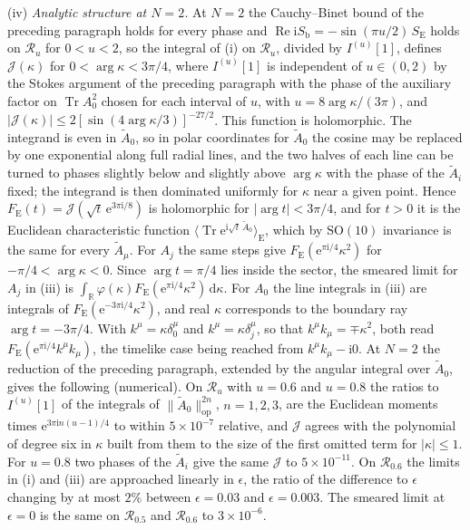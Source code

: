 (iv) \emph{Analytic structure at \(N=2\).} At \(N=2\) the Cauchy--Binet bound of the preceding paragraph holds for every phase and \(\operatorname{Re}\mathrm iS_{\mathrm b}=-\sin(\pi u/2)\,S_{\mathrm E}\) holds on \(\mathcal R_u\) for \(0<u<2\), so the integral of (i) on \(\mathcal R_u\), divided by \(I^{(u)}[1]\), defines \(\mathcal J(\kappa)\) for \(0<\arg\kappa<3\pi/4\), where \(I^{(u)}[1]\) is independent of \(u\in(0,2)\) by the Stokes argument of the preceding paragraph with the phase of the auxiliary factor on \(\operatorname{Tr}A_0^2\) chosen for each interval of \(u\), with \(u=8\arg\kappa/(3\pi)\), and \(|\mathcal J(\kappa)|\le2[\sin(4\arg\kappa/3)]^{-27/2}\). This function is holomorphic. The integrand is even in \(\tilde A_0\), so in polar coordinates for \(\tilde A_0\) the cosine may be replaced by one exponential along full radial lines, and the two halves of each line can be turned to phases slightly below and slightly above \(\arg\kappa\) with the phase of the \(\tilde A_i\) fixed; the integrand is then dominated uniformly for \(\kappa\) near a given point. Hence \(F_{\mathrm E}(t)=\mathcal J(\sqrt t\,\mathrm e^{3\pi\mathrm i/8})\) is holomorphic for \(|\arg t|<3\pi/4\), and for \(t>0\) it is the Euclidean characteristic function \(\langle\operatorname{Tr}\mathrm e^{\mathrm i\sqrt t\,\tilde A_0}\rangle_{\mathrm E}\), which by \(\mathrm{SO}(10)\) invariance is the same for every \(\tilde A_\mu\). For \(A_j\) the same steps give \(F_{\mathrm E}(\mathrm e^{\pi\mathrm i/4}\kappa^2)\) for \(-\pi/4<\arg\kappa<0\). Since \(\arg t=\pi/4\) lies inside the sector, the smeared limit for \(A_j\) in (iii) is \(\int_{\mathbb R}\varphi(\kappa)F_{\mathrm E}(\mathrm e^{\pi\mathrm i/4}\kappa^2)\,\mathrm d\kappa\). For \(A_0\) the line integrals in (iii) are integrals of \(F_{\mathrm E}(\mathrm e^{-3\pi\mathrm i/4}\kappa^2)\), and real \(\kappa\) corresponds to the boundary ray \(\arg t=-3\pi/4\). With \(k^\mu=\kappa\delta^\mu_0\) and \(k^\mu=\kappa\delta^\mu_j\), so that \(k^\mu k_\mu=\mp\kappa^2\), both read \(F_{\mathrm E}(\mathrm e^{\pi\mathrm i/4}k^\mu k_\mu)\), the timelike case being reached from \(k^\mu k_\mu-\mathrm i0\). At \(N=2\) the reduction of the preceding paragraph, extended by the angular integral over \(\tilde A_0\), gives the following (numerical). On \(\mathcal R_u\) with \(u=0.6\) and \(u=0.8\) the ratios to \(I^{(u)}[1]\) of the integrals of \(\|\tilde A_0\|_{\mathrm{op}}^{2n}\), \(n=1,2,3\), are the Euclidean moments times \(\mathrm e^{3\pi\mathrm in(u-1)/4}\) to within \(5\times10^{-7}\) relative, and \(\mathcal J\) agrees with the polynomial of degree six in \(\kappa\) built from them to the size of the first omitted term for \(|\kappa|\le1\). For \(u=0.8\) two phases of the \(\tilde A_i\) give the same \(\mathcal J\) to \(5\times10^{-11}\). On \(\mathcal R_{0.6}\) the limits in (i) and (iii) are approached linearly in \(\epsilon\), the ratio of the difference to \(\epsilon\) changing by at most \(2\%\) between \(\epsilon=0.03\) and \(\epsilon=0.003\). The smeared limit at \(\epsilon=0\) is the same on \(\mathcal R_{0.5}\) and \(\mathcal R_{0.6}\) to \(3\times10^{-6}\).

